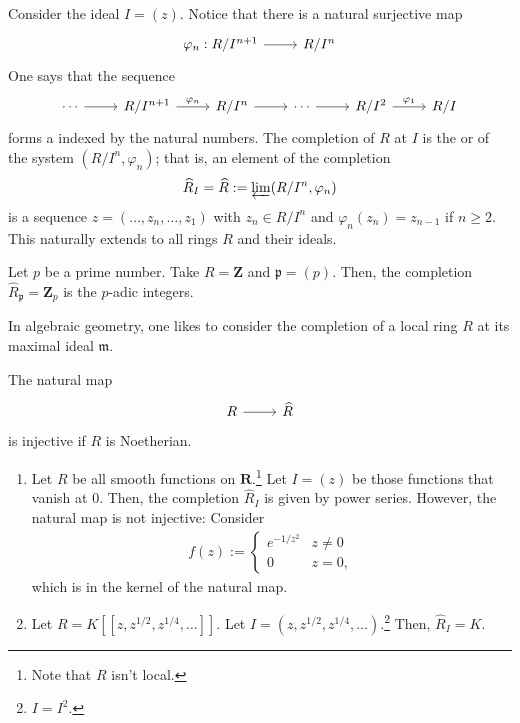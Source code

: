 \documentclass [11 pt, oneside] {article}
\begin{document}
Consider the ideal $I=(z)$. Notice that there is a natural surjective map
\[
\begin{tikzcd}
\varphi_n :R/I^{n+1} \ar[r]& R/I^{n}
\end{tikzcd}
\] 
One says that the sequence
\[
\begin{tikzcd}
	\cdots\ar[r] &R/I^{n+1}\ar[r,"\varphi_n"]&R/I^n \ar[r] &\cdots\ar[r] &R/I^2 \ar[r,"\varphi_1"] &R/I 
\end{tikzcd}
\]
forms a  indexed by the natural numbers.
The completion of $R$ at $I$ is the  or  of the system $(R/I^n, \varphi_n)$; that is, an element of the completion
\begin{align*}
	\widehat{R}_I = \widehat{R} := \varprojlim (R/I^n, \varphi_n)
\end{align*}
is a sequence $z=(\hdots, z_n,\hdots,z_1)$ with $z_n\in R/I^n$ and $\varphi_n (z_n)=z_{n-1}$ if $n\ge 2$. This naturally extends to all rings $R$ and their ideals.

\begin{example}[ ]\label{}\text{}
Let $p$ be a prime number. Take $R=\mathbf{Z}$ and $\mathfrak{p}=(p)$. Then, the completion $\widehat{R}_{\mathfrak{p}} = \mathbf{Z}_p$ is the $p$-adic integers.
\end{example}

In algebraic geometry, one likes to consider the completion of a local ring $R$ at its maximal ideal $\mathfrak{m}$.

The natural map 
\[
\begin{tikzcd}
R\ar[r]& \widehat{R}
\end{tikzcd}
\] 
is injective if $R$ is Noetherian.

\begin{example}\label{}\text{}
\begin{enumerate}
	\item Let $R$ be all smooth functions on $\mathbf{R}$.\footnote{Note that $R$ isn't local.} Let $I=(z)$ be those functions that vanish at $0$. Then, the completion $\widehat{R}_I$ is given by power series. However, the natural map is not injective: Consider
		\begin{align*}
			f(z):=
			 \begin{cases}
				 e^{-1/z^2}&z\ne 0\\
				 0&z=0,
			\end{cases}
		\end{align*}
		which is in the kernel of the natural map.
	\item Let $R = K [\![z,z^{1/2},z^{1/4},\hdots]\!]$. Let $I=(z,z^{1/2},z^{1/4},\hdots)$.\footnote{$I=I^2$.} Then, $\widehat{R}_I = K$.
\end{enumerate}
\end{example}
\end{document}
